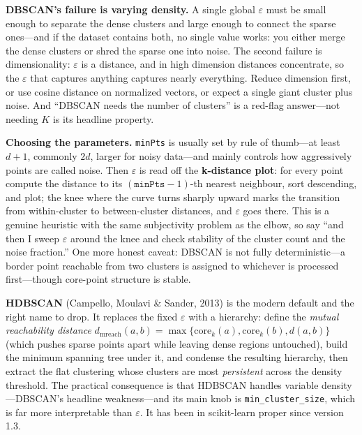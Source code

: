 \begin{warningbox}
\textbf{DBSCAN's failure is varying density.} A single global $\varepsilon$ must be small enough to separate the dense clusters and large enough to connect the sparse ones---and if the dataset contains both, no single value works: you either merge the dense clusters or shred the sparse one into noise. The second failure is dimensionality: $\varepsilon$ is a distance, and in high dimension distances concentrate, so the $\varepsilon$ that captures anything captures nearly everything. Reduce dimension first, or use cosine distance on normalized vectors, or expect a single giant cluster plus noise. And ``DBSCAN needs the number of clusters'' is a red-flag answer---not needing $K$ is its headline property.
\end{warningbox}

\textbf{Choosing the parameters.} \texttt{minPts} is usually set by rule of thumb---at least $d+1$, commonly $2d$, larger for noisy data---and mainly controls how aggressively points are called noise. Then $\varepsilon$ is read off the \textbf{k-distance plot}: for every point compute the distance to its $(\texttt{minPts}-1)$-th nearest neighbour, sort descending, and plot; the knee where the curve turns sharply upward marks the transition from within-cluster to between-cluster distances, and $\varepsilon$ goes there. This is a genuine heuristic with the same subjectivity problem as the elbow, so say ``and then I sweep $\varepsilon$ around the knee and check stability of the cluster count and the noise fraction.'' One more honest caveat: DBSCAN is not fully deterministic---a border point reachable from two clusters is assigned to whichever is processed first---though core-point structure is stable.

\textbf{HDBSCAN} (Campello, Moulavi \& Sander, 2013) is the modern default and the right name to drop. It replaces the fixed $\varepsilon$ with a hierarchy: define the \emph{mutual reachability distance} $d_{\mathrm{mreach}}(a,b) = \max\{\mathrm{core}_k(a), \mathrm{core}_k(b), d(a,b)\}$ (which pushes sparse points apart while leaving dense regions untouched), build the minimum spanning tree under it, and condense the resulting hierarchy, then extract the flat clustering whose clusters are most \emph{persistent} across the density threshold. The practical consequence is that HDBSCAN handles variable density---DBSCAN's headline weakness---and its main knob is \texttt{min\_cluster\_size}, which is far more interpretable than $\varepsilon$. It has been in scikit-learn proper since version 1.3.


